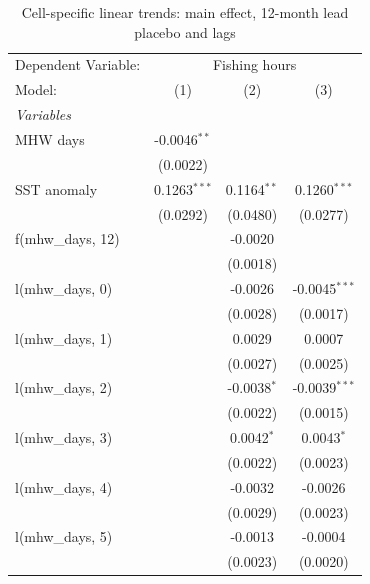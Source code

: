 
\begin{table}[htbp]
   \caption{\label{tab:celltrend} Cell-specific linear trends: main effect, 12-month lead placebo and lags}
   \centering
   \begin{tabular}{lccc}
      \tabularnewline \midrule \midrule
      Dependent Variable: & \multicolumn{3}{c}{Fishing hours}\\
      Model:               & (1)            & (2)           & (3)\\  
      \midrule
      \emph{Variables}\\
      MHW days             & -0.0046$^{**}$ &               &   \\   
                           & (0.0022)       &               &   \\   
      SST anomaly          & 0.1263$^{***}$ & 0.1164$^{**}$ & 0.1260$^{***}$\\   
                           & (0.0292)       & (0.0480)      & (0.0277)\\   
      f(mhw\_days, 12)     &                & -0.0020       &   \\   
                           &                & (0.0018)      &   \\   
      l(mhw\_days, 0)      &                & -0.0026       & -0.0045$^{***}$\\   
                           &                & (0.0028)      & (0.0017)\\   
      l(mhw\_days, 1)      &                & 0.0029        & 0.0007\\   
                           &                & (0.0027)      & (0.0025)\\   
      l(mhw\_days, 2)      &                & -0.0038$^{*}$ & -0.0039$^{***}$\\   
                           &                & (0.0022)      & (0.0015)\\   
      l(mhw\_days, 3)      &                & 0.0042$^{*}$  & 0.0043$^{*}$\\   
                           &                & (0.0022)      & (0.0023)\\   
      l(mhw\_days, 4)      &                & -0.0032       & -0.0026\\   
                           &                & (0.0029)      & (0.0023)\\   
      l(mhw\_days, 5)      &                & -0.0013       & -0.0004\\   
                           &                & (0.0023)      & (0.0020)\\   

\end{tabular}
\end{table}
